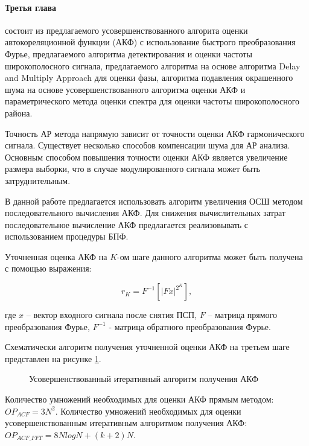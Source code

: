 \paragraph{Третья глава} состоит из предлагаемого усовершенствованного алгорита оценки автокореляционной функции (АКФ) с использование
быстрого преобразования Фурье, предлагаемого алгоритма детектирования и оценки частоты широкополосного сигнала,
предлагаемого алгоритма на основе алгоритма Delay and Multiply Approach для оценки фазы, алгоритма подавления
окрашенного шума на основе усовершенствованного алгоритма оценки АКФ и параметрического метода оценки спектра
для оценки частоты широкополосного района.

Точность АР метода напрямую зависит от точности оценки АКФ гармонического сигнала.
Существует несколько способов компенсации шума для АР анализа.
Основным способом повышения точности оценки АКФ является увеличение размера выборки, что в случае модулированного сигнала может быть затруднительным. 

В данной работе предлагается использовать алгоритм увеличения ОСШ методом последовательного вычисления АКФ.
Для снижения вычислительных затрат последовательное вычисление АКФ предлагается реализовывать с использованием процедуры БПФ. 

Уточненная оценка АКФ на ${K}$-ом шаге данного алгоритма может быть получена с помощью выражения:
\begin{center}
\begin{equation}
	\label{eq:akf_3}
	\hat{r}_K = F^{-1}\left[ \left| Fx \right| ^{2^K} \right],
\end{equation}
\end{center}
где ${x}$ – вектор входного сигнала после снятия ПСП, ${F}$ – матрица прямого преобразования Фурье,
${F^{-1}}$ - матрица обратного преобразования Фурье.

Схематически алгоритм получения уточненной оценки АКФ на третьем шаге представлен на рисунке \ref{pic:akf_pic}.
\begin{figure}[H]
	\center{}
	\caption{Усовершенствованный итеративный алгоритм получения АКФ}
	\label{pic:akf_pic}
\end{figure}

Количество умножений необходимых для оценки АКФ прямым методом: ${OP_{ACF} = 3N^2}$. Количество умножений необходимых для оценки
усовершенствованным итеративным алгоритмом получения АКФ: ${OP_{ACF\_FFT} = 8NlogN + (k+2)N}$.

